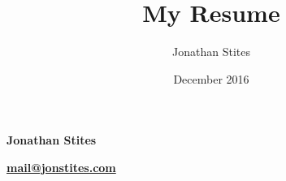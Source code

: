 \documentclass{article}
\title{My Resume}
\author{Jonathan Stites}
\date{December 2016}
\begin{document}
\center
\textbf{\LARGE{} Jonathan Stites }{\LARGE \par}
\textbf{\href{mailto:mail+resume@jonstites.com}{mail@jonstites.com}}
\end{document}
